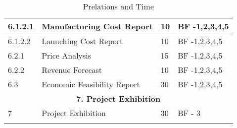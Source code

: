 \begin{longtable}{ | p{1.3cm} | p{7cm} | p{3cm} | p{3.5cm} |}
6.1.2.1 & Manufacturing Cost Report & 10 & BF -1,2,3,4,5  \\ \hline
6.1.2.2 & Launching Cost Report  & 10 & BF -1,2,3,4,5 \\ \hline
6.2.1 & Price Analysis & 15 & BF -1,2,3,4,5  \\ \hline
6.2.2 & Revenue Forecast & 10 & BF -1,2,3,4,5  \\ \hline
6.3 & Economic Feasibility Report & 30 & BF -1,2,3,4,5 \\ \hline
\multicolumn{4}{|c|}{\textbf{7. Project Exhibition}} \\ \hline
7 & Project Exhibition &30 & BF - 3 \\ \hline
\caption{Prelations and Time} \\
\end{longtable}
